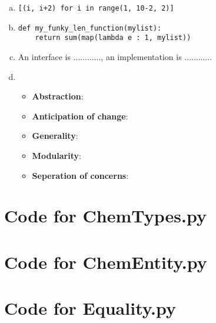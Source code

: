 \documentclass[12pt]{article}
\begin{document}
\begin{enumerate}[a)]
\item
\begin{lstlisting}
[(i, i+2) for i in range(1, 10-2, 2)]
\end{lstlisting}

\item
\begin{lstlisting}
def my_funky_len_function(mylist):
    return sum(map(lambda e : 1, mylist))
\end{lstlisting}

\item An interface is ............, an implementation is ............

\item
\begin{itemize}[\label{}]
    \item \textbf{Abstraction}:
    \item \textbf{Anticipation of change}:
    \item \textbf{Generality}:
    \item \textbf{Modularity}:
    \item \textbf{Seperation of concerns}:
\end{itemize}

\end{enumerate}

\newpage

\lstset{language=Python, basicstyle=\tiny, breaklines=true, showspaces=false,
  showstringspaces=false, breakatwhitespace=true}

\def\thesection{\Alph{section}}

\section{Code for ChemTypes.py}

\noindent 

\newpage

\section{Code for ChemEntity.py}

\noindent 

\newpage

\section{Code for Equality.py}
\end{document}

